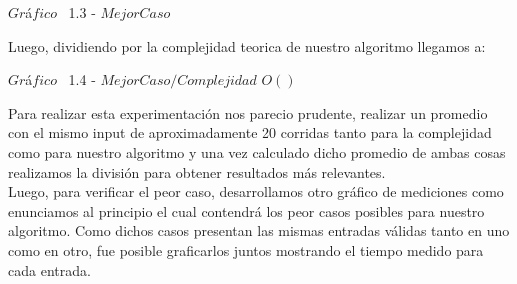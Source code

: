 \vspace*{0.3cm} \vspace*{0.3cm}
  \begin{center}
{$Gr$\'a$fico$ \ 1.3 - $Mejor Caso$}
  \end{center}
  \vspace*{0.3cm}


Luego, dividiendo por la complejidad teorica de nuestro algoritmo llegamos a:\\

\vspace*{0.3cm} \vspace*{0.3cm}
  \begin{center}
{$Gr$\'a$fico$ \ 1.4 - $Mejor Caso / Complejidad$ $O()$}
  \end{center}
  \vspace*{0.3cm}


Para realizar esta experimentaci\'on nos parecio prudente, realizar un promedio con el mismo input de aproximadamente 20 corridas
tanto para la complejidad como para nuestro algoritmo y una vez calculado dicho promedio de ambas cosas realizamos la divisi\'on para
obtener resultados m\'as relevantes.\\ 


Luego, para verificar el peor caso, desarrollamos otro gr\'afico de mediciones como enunciamos al principio el cual contendr\'a los peor casos posibles para nuestro algoritmo. Como dichos casos presentan las mismas entradas v\'alidas tanto en uno como en otro, fue posible graficarlos juntos mostrando el tiempo medido para cada entrada.\\

